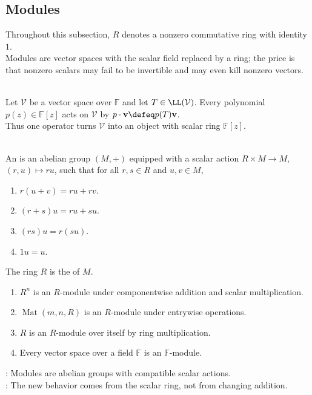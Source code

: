 \subsection{Modules}

Throughout this subsection, $R$ denotes a nonzero commutative ring with identity $1$.\\
Modules are vector spaces with the scalar field replaced by a ring; the price is that nonzero scalars may fail to be invertible and may even kill nonzero vectors.

\begin{perspective} \label{per:operator-as-module-motivation} \\
Let $\mathcal{V}$ be a vector space over $\mathbb{F}$ and let $T\in\LL(\mathcal{V})$. Every polynomial $p(z)\in\mathbb{F}[z]$ acts on $\mathcal{V}$ by $p\cdot\mathbf{v}\defeq p(T)\mathbf{v}$.\\
Thus one operator turns $\mathcal{V}$ into an object with scalar ring $\mathbb{F}[z]$.
\end{perspective}

\begin{definition} \label{def:module-over-ring} \\
An  is an abelian group $(M,+)$ equipped with a scalar action
$R\times M\to M$, $(r,u)\mapsto ru$, such that for all $r,s\in R$ and $u,v\in M$,
\begin{enumerate}[label=(\roman*)]
\setlength{\itemsep}{0pt}
\item $r(u+v)=ru+rv$.
\item $(r+s)u=ru+su$.
\item $(rs)u=r(su)$.
\item $1u=u$.
\end{enumerate}
The ring $R$ is the  of $M$.
\end{definition}

\begin{example} \label{ex:basic-module-models} 
\begin{enumerate}[label=(\roman*)]
\setlength{\itemsep}{0pt}
\item $R^n$ is an $R$-module under componentwise addition and scalar multiplication.
\item $\operatorname{Mat}(m,n,R)$ is an $R$-module under entrywise operations.
\item $R$ is an $R$-module over itself by ring multiplication.
\item Every vector space over a field $\mathbb{F}$ is an $\mathbb{F}$-module.
\end{enumerate}
: Modules are abelian groups with compatible scalar actions.\\
: The new behavior comes from the scalar ring, not from changing addition.
\end{example}

